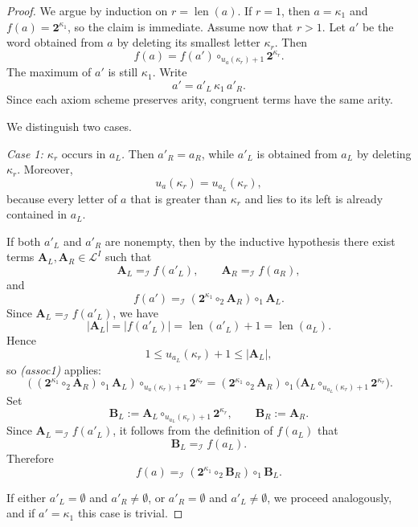 \documentclass[10pt,a4paper]{amsart}
\renewcommand{\le}{\leqslant}\renewcommand{\ge}{\geqslant}
\begin{document}
\begin{proof}
We argue by induction on \(r=\operatorname{len}(a)\). If \(r=1\), then \(a=\kappa_1\) and $f(a)=\mathbf 2^{\kappa_1}$, so the claim is immediate. Assume now that \(r>1\). Let \(a'\) be the word
obtained from \(a\) by deleting its smallest letter \(\kappa_r\). Then
\[
f(a)=f(a')\circ_{u_a(\kappa_r)+1}\mathbf 2^{\kappa_r}.
\]
The maximum of \(a'\) is still \(\kappa_1\). Write
\[
a'=a'_L\,\kappa_1\,a'_R.
\]
Since each axiom scheme preserves arity, congruent terms have the same arity.

We distinguish two cases.

\medskip
\noindent\emph{Case 1: \(\kappa_r\text{ occurs in } a_L\).} Then \(a'_R=a_R\), while \(a'_L\) is obtained from \(a_L\) by deleting
\(\kappa_r\). Moreover,
\[
u_a(\kappa_r)=u_{a_L}(\kappa_r),
\]
because every letter of \(a\) that is greater than \(\kappa_r\) and lies to its
left is already contained in \(a_L\).

\smallskip
\noindent If both \(a'_L\) and \(a'_R\) are nonempty, then by the inductive
hypothesis there exist terms \(\mathbf A_L,\mathbf A_R\in\mathcal L^I\) such that
\[
\mathbf A_L =_{\mathcal I} f(a'_L),\qquad \mathbf A_R =_{\mathcal I} f(a_R),
\]
and
\[
f(a') =_{\mathcal I} (\mathbf 2^{\kappa_1}\circ_2 \mathbf A_R)\circ_1 \mathbf A_L.
\]
Since \(\mathbf A_L =_{\mathcal I} f(a'_L)\), we have
\[
|\mathbf A_L|=|f(a'_L)|=\operatorname{len}(a'_L)+1=\operatorname{len}(a_L).
\]
Hence
\[
1\le u_{a_L}(\kappa_r)+1\le |\mathbf A_L|,
\]
so \emph{(assoc1)} applies:
\[
((\mathbf 2^{\kappa_1}\circ_2 \mathbf A_R)\circ_1 \mathbf A_L)\circ_{u_a(\kappa_r)+1}\mathbf 2^{\kappa_r}
=
(\mathbf 2^{\kappa_1}\circ_2 \mathbf A_R)\circ_1
\bigl(\mathbf A_L\circ_{u_{a_L}(\kappa_r)+1}\mathbf 2^{\kappa_r}\bigr).
\]
Set
\[
\mathbf B_L:=\mathbf A_L\circ_{u_{a_L}(\kappa_r)+1}\mathbf 2^{\kappa_r},
\qquad
\mathbf B_R:=\mathbf A_R.
\]
Since \(\mathbf A_L =_{\mathcal I} f(a'_L)\), it follows from the definition of \(f(a_L)\)
that
\[
\mathbf B_L =_{\mathcal I} f(a_L).
\]
Therefore
\[
f(a)=_{\mathcal I}(\mathbf 2^{\kappa_1}\circ_2 \mathbf B_R)\circ_1 \mathbf B_L.
\]

\smallskip
\noindent If either \(a'_L=\emptyset\) and \(a'_R\neq\emptyset\), or \(a'_R=\emptyset\) and \(a'_L\neq\emptyset\), we proceed analogously, and if \(a'=\kappa_1\) this case is trivial.


\end{proof}
\end{document}
